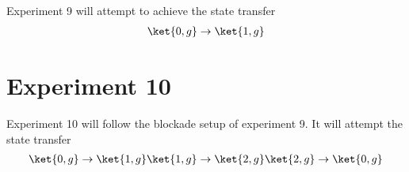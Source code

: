 \documentclass[letterpaper, 12pt]{article}
\begin{document}
Experiment 9 will attempt to achieve the state transfer
\begin{align*}
  \ket{0, g} \rightarrow \ket{1, g}
\end{align*}

\section{Experiment 10}
Experiment 10 will follow the blockade setup of experiment 9. It will
attempt the state transfer
\begin{align*}
  \ket{0, g} \rightarrow \ket{1, g}
  \ket{1, g} \rightarrow \ket{2, g}
  \ket{2, g} \rightarrow \ket{0, g}
\end{align*}



\end{document}
